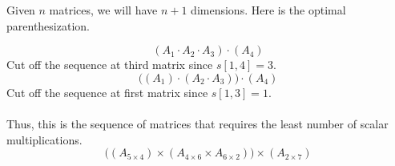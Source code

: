 \documentclass[12pt]{article}
\begin{document}
Given $n$ matrices, we will have $n+1$ dimensions. Here is the optimal parenthesization.

\begin{equation*}
    (A_1 \cdot A_2 \cdot A_3) \cdot (A_4)
\end{equation*}
Cut off the sequence at third matrix since $s[1, 4] = 3$. \\
\begin{equation*}
    \big((A_1) \cdot (A_2 \cdot A_3)\big) \cdot (A_4)
\end{equation*}
Cut off the sequence at first matrix since $s[1, 3] = 1$.
\\ \\
Thus, this is the sequence of matrices that requires the least number of scalar multiplications.
\begin{equation*}
    \big((A_{5\times4}) \times (A_{4\times6} \times A_{6\times2})\big) \times (A_{2\times7})
\end{equation*}
\end{document}
